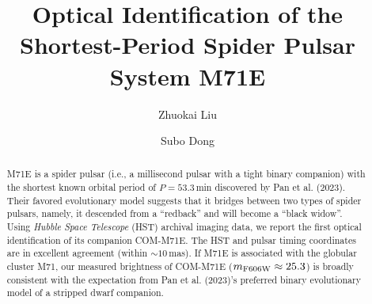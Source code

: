 \documentclass[twocolumn]{aastex631}
\begin{document}
\title{Optical Identification of the Shortest-Period Spider Pulsar System M71E}


\author{Zhuokai Liu}
\author{Subo Dong}

\begin{abstract}
M71E is a spider pulsar (i.e., a millisecond pulsar with a tight binary companion) with the shortest known orbital period of $P=53.3$\,min discovered by Pan et al. (2023). Their favored evolutionary model suggests that it bridges between two types of spider pulsars, namely, it descended from a ``redback'' and will become a ``black widow''. Using {\it Hubble Space Telescope} (HST) archival imaging data, we report the first optical identification of its companion COM-M71E. The HST and pulsar timing coordinates are in excellent agreement (within $\sim10$\,mas). If M71E is associated with the globular cluster M71, our measured brightness of COM-M71E ($m_{\rm F606W} \approx 25.3$) is broadly consistent with the expectation from Pan et al. (2023)'s preferred binary evolutionary model of a stripped dwarf companion. 
\end{abstract}

\end{document}
